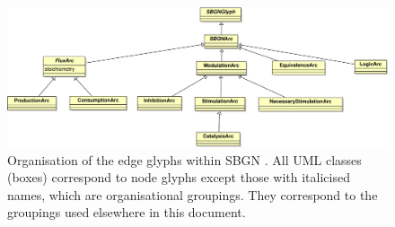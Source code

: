 \begin{figure}[htb!]
\begin{center}
\includegraphics[width=\linewidth]{images/sbgn_edge_taxonomy}
\caption{Organisation of the edge glyphs within SBGN \PDl. All UML classes (boxes) correspond to \PD node glyphs except those with italicised names, which are organisational groupings. They correspond to the groupings used elsewhere in this document.}
\label{fig:sbgn_edge_tax}
\end{center}
\end{figure}


